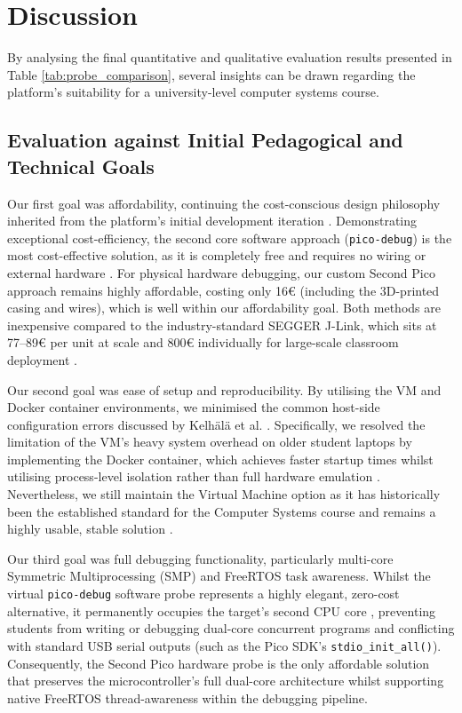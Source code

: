 \section{Discussion}
By analysing the final quantitative and qualitative evaluation results presented in Table \ref{tab:probe_comparison}, several insights can be drawn regarding the platform's suitability for a university-level computer systems course.

\subsection{Evaluation against Initial Pedagogical and Technical Goals}

Our first goal was affordability, continuing the cost-conscious design philosophy inherited from the platform's initial development iteration \cite{kelhala:2024}. Demonstrating exceptional cost-efficiency, the second core software approach (\texttt{pico-debug}) is the most cost-effective solution, as it is completely free and requires no wiring or external hardware \cite{pico_debug}. For physical hardware debugging, our custom Second Pico approach remains highly affordable, costing only 16€ (including the 3D-printed casing and wires), which is well within our affordability goal. Both methods are inexpensive compared to the industry-standard SEGGER J-Link, which sits at 77--89€ per unit at scale and 800€ individually for large-scale classroom deployment \cite{jlink}.

Our second goal was ease of setup and reproducibility. By utilising the VM and Docker container environments, we minimised the common host-side configuration errors discussed by Kelhälä et al. \cite{kelhala:2024}. Specifically, we resolved the limitation of the VM's heavy system overhead on older student laptops by implementing the Docker container, which achieves faster startup times whilst utilising process-level isolation rather than full hardware emulation \cite{rosen_namespaces_slides}. Nevertheless, we still maintain the Virtual Machine option as it has historically been the established standard for the Computer Systems course and remains a highly usable, stable solution \cite{tkj_vm_history}.

Our third goal was full debugging functionality, particularly multi-core Symmetric Multiprocessing (SMP) and FreeRTOS task awareness. Whilst the virtual \texttt{pico-debug} software probe represents a highly elegant, zero-cost alternative, it permanently occupies the target's second CPU core \cite{pico_debug}, preventing students from writing or debugging dual-core concurrent programs and conflicting with standard USB serial outputs (such as the Pico SDK's \texttt{stdio\_init\_all()}). Consequently, the Second Pico hardware probe is the only affordable solution that preserves the microcontroller's full dual-core architecture whilst supporting native FreeRTOS thread-awareness within the debugging pipeline.

